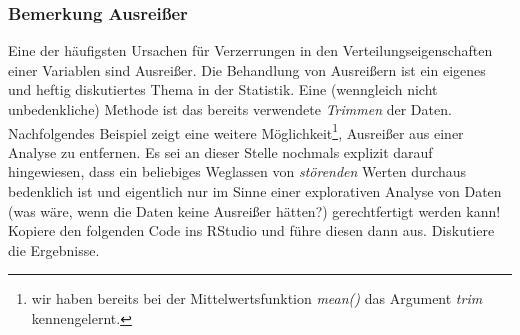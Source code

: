 \documentclass[]{article}
\let\rmarkdownfootnote\footnote%
\def\footnote{\protect\rmarkdownfootnote}
\begin{document}
\subsubsection*{Bemerkung Ausreißer}\label{bemerkung-ausreier}

Eine der häufigsten Ursachen für Verzerrungen in den
Verteilungseigenschaften einer Variablen sind Ausreißer. Die Behandlung
von Ausreißern ist ein eigenes und heftig diskutiertes Thema in der
Statistik. Eine (wenngleich nicht unbedenkliche) Methode ist das bereits
verwendete \emph{Trimmen} der Daten. Nachfolgendes Beispiel zeigt eine
weitere Möglichkeit\footnote{wir haben bereits bei der
  Mittelwertsfunktion \emph{mean()} das Argument \emph{trim}
  kennengelernt.}, Ausreißer aus einer Analyse zu entfernen. Es sei an
dieser Stelle nochmals explizit darauf hingewiesen, dass ein beliebiges
Weglassen von \emph{störenden} Werten durchaus bedenklich ist und
eigentlich nur im Sinne einer explorativen Analyse von Daten (was wäre,
wenn die Daten keine Ausreißer hätten?) gerechtfertigt werden kann!
Kopiere den folgenden Code ins RStudio und führe diesen dann aus.
Diskutiere die Ergebnisse.
\end{document}
